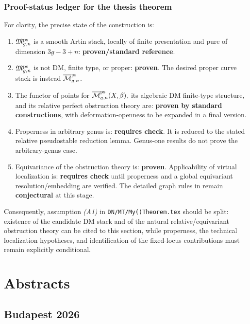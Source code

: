 \documentclass[12pt]{memoir}
\begin{document}
\subsection{Proof-status ledger for the thesis theorem}

For clarity, the precise state of the construction is:
\begin{enumerate}
    \item \(\mathfrak M^{\operatorname{\mathrm{ps}}}_{g,n}\) is a smooth Artin stack, locally of
    finite presentation and pure of dimension \(3g-3+n\):
    \textbf{proven/standard reference}.
    \item \(\mathfrak M^{\operatorname{\mathrm{ps}}}_{g,n}\) is not DM, finite type, or proper:
    \textbf{proven}.  The desired proper curve stack is instead
    \(\overline{\mathcal{M}}^{\operatorname{\mathrm{ps}}}_{g,n}\).
    \item The functor of points for
    \(\overline{\mathcal{M}}^{\operatorname{\mathrm{ps}}}_{g,n}(X,\beta)\), its algebraic DM finite-type
    structure, and its relative perfect obstruction theory are:
    \textbf{proven by standard constructions}, with deformation-openness to
    be expanded in a final version.
    \item Properness in arbitrary genus is: \textbf{requires check}.  It is
    reduced to the stated relative pseudostable reduction lemma.  Genus-one
    results do not prove the arbitrary-genus case.
    \item Equivariance of the obstruction theory is: \textbf{proven}.
    Applicability of virtual localization is: \textbf{requires check} until
    properness and a global equivariant resolution/embedding are verified.
    The detailed graph rules in \cite{DustyNotes} remain
    \textbf{conjectural} at this stage.
\end{enumerate}

Consequently, assumption \emph{(A1)} in \texttt{DN/MT/My()Theorem.tex}
should be split: existence of the candidate DM stack and of the natural
relative/equivariant obstruction theory can be cited to this section, while
properness, the technical localization hypotheses, and identification of the
fixed-locus contributions must remain explicitly conditional.

\fi

\chapter{Abstracts}

\section{Budapest 2026}
\end{document}
